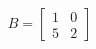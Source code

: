 \documentclass[preview]{standalone}
\begin{document}
\begin{align*}
B = \begin{bmatrix} 
                        1 & 0\\
                        5 & 2
                    \end{bmatrix}
\end{align*}
\end{document}
